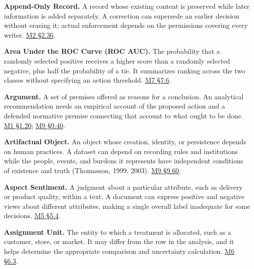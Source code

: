 \noindent\textbf{Append-Only Record.} A record whose existing content is
preserved while later information is added separately. A correction can
supersede an earlier decision without erasing it; actual enforcement
depends on the permissions covering every writer.
\href{Marketing_Analytics_Lecture_Notes.pdf\#M02-preserved-records-and-the-authority-to-revise}{M2
§2.36}.

\noindent\textbf{Area Under the ROC Curve (ROC AUC).} The probability that a
randomly selected positive receives a higher score than a randomly
selected negative, plus half the probability of a tie. It summarizes
ranking across the two classes without specifying an action threshold.
\href{Marketing_Analytics_Lecture_Notes.pdf\#M07-ranking-and-calibration-answer-different-questions}{M7
§7.6}.

\noindent\textbf{Argument.} A set of premises offered as reasons for a
conclusion. An analytical recommendation needs an empirical account of
the proposed action and a defended normative premise connecting that
account to what ought to be done.
\href{Marketing_Analytics_Lecture_Notes.pdf\#M01-a-recommendation-as-an-argument}{M1
§1.20};
\hyperref[M09-logical-consequence-and-a-defensible-recommendation]{M9
§9.40}.

\noindent\textbf{Artifactual Object.} An object whose creation, identity, or
persistence depends on human practices. A dataset can depend on
recording rules and institutions while the people, events, and burdens
it represents have independent conditions of existence and truth
(Thomasson, 1999, 2003).
\hyperref[M09-the-ontology-of-a-dataset]{M9
§9.60}.

\noindent\textbf{Aspect Sentiment.} A judgment about a particular attribute, such
as delivery or product quality, within a text. A document can express
positive and negative views about different attributes, making a single
overall label inadequate for some decisions.
\href{Marketing_Analytics_Lecture_Notes.pdf\#M05-sentiment-aspect-labels-and-topic-models}{M5
§5.4}.

\noindent\textbf{Assignment Unit.} The entity to which a treatment is allocated,
such as a customer, store, or market. It may differ from the row in the
analysis, and it helps determine the appropriate comparison and
uncertainty calculation.
\href{Marketing_Analytics_Lecture_Notes.pdf\#M06-designing-an-experiment-around-the-decision}{M6
§6.3}.

